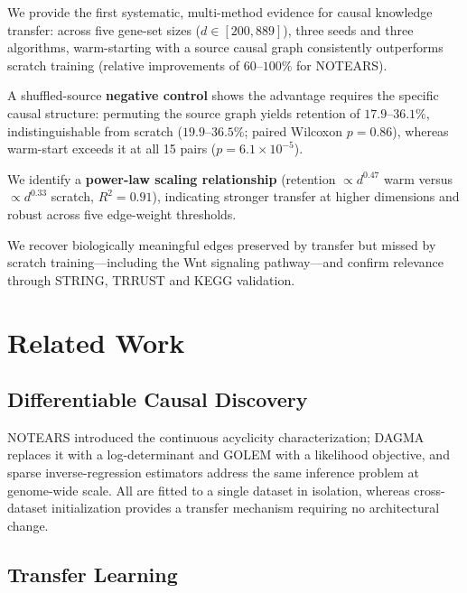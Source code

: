\documentclass{ws-jbcb}
\begin{document}
\begin{romanlist}[(i)]
\item We provide the first systematic, multi-method evidence for causal knowledge transfer: across five gene-set sizes ($d \in [200, 889]$), three seeds and three algorithms, warm-starting with a source causal graph consistently outperforms scratch training (relative improvements of $60$--$100\%$ for NOTEARS).
\item A shuffled-source \textbf{negative control} shows the advantage requires the specific causal structure: permuting the source graph yields retention of $17.9$--$36.1\%$, indistinguishable from scratch ($19.9$--$36.5\%$; paired Wilcoxon $p=0.86$), whereas warm-start exceeds it at all 15 pairs ($p=6.1\times10^{-5}$).
\item We identify a \textbf{power-law scaling relationship} (retention $\propto d^{0.47}$ warm versus $\propto d^{0.33}$ scratch, $R^2 = 0.91$), indicating stronger transfer at higher dimensions and robust across five edge-weight thresholds.
\item We recover biologically meaningful edges preserved by transfer but missed by scratch training---including the Wnt signaling pathway---and confirm relevance through STRING, TRRUST and KEGG validation.
\end{romanlist}

\section{Related Work}

\subsection{Differentiable Causal Discovery}

NOTEARS\cite{zheng2018} introduced the continuous acyclicity characterization; DAGMA\cite{bello2022} replaces it with a log-determinant and GOLEM\cite{ng2020} with a likelihood objective, and sparse inverse-regression estimators address the same inference problem at genome-wide scale\cite{brown2025}. All are fitted to a single dataset in isolation, whereas cross-dataset initialization provides a transfer mechanism requiring no architectural change.

\subsection{Transfer Learning}
\end{document}
